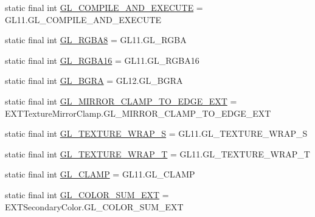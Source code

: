 \begin{DoxyCompactItemize}
static final int \mbox{\hyperlink{interfaceorg_1_1newdawn_1_1slick_1_1opengl_1_1renderer_1_1_s_g_l_a43e3cd16dc9ba9bc850f4c6f035c0ba7}{G\+L\+\_\+\+C\+O\+M\+P\+I\+L\+E\+\_\+\+A\+N\+D\+\_\+\+E\+X\+E\+C\+U\+TE}} = G\+L11.\+G\+L\+\_\+\+C\+O\+M\+P\+I\+L\+E\+\_\+\+A\+N\+D\+\_\+\+E\+X\+E\+C\+U\+TE
\item 
static final int \mbox{\hyperlink{interfaceorg_1_1newdawn_1_1slick_1_1opengl_1_1renderer_1_1_s_g_l_a015ce5deda3c63768e9784f5132cfc17}{G\+L\+\_\+\+R\+G\+B\+A8}} = G\+L11.\+G\+L\+\_\+\+R\+G\+BA
\item 
static final int \mbox{\hyperlink{interfaceorg_1_1newdawn_1_1slick_1_1opengl_1_1renderer_1_1_s_g_l_a66c36ff1594277277c28955a35428008}{G\+L\+\_\+\+R\+G\+B\+A16}} = G\+L11.\+G\+L\+\_\+\+R\+G\+B\+A16
\item 
static final int \mbox{\hyperlink{interfaceorg_1_1newdawn_1_1slick_1_1opengl_1_1renderer_1_1_s_g_l_ae752a498b0a87eeaa6ca19488c992906}{G\+L\+\_\+\+B\+G\+RA}} = G\+L12.\+G\+L\+\_\+\+B\+G\+RA
\item 
static final int \mbox{\hyperlink{interfaceorg_1_1newdawn_1_1slick_1_1opengl_1_1renderer_1_1_s_g_l_af110bc1dacabdf79561c080a32b5ac87}{G\+L\+\_\+\+M\+I\+R\+R\+O\+R\+\_\+\+C\+L\+A\+M\+P\+\_\+\+T\+O\+\_\+\+E\+D\+G\+E\+\_\+\+E\+XT}} = E\+X\+T\+Texture\+Mirror\+Clamp.\+G\+L\+\_\+\+M\+I\+R\+R\+O\+R\+\_\+\+C\+L\+A\+M\+P\+\_\+\+T\+O\+\_\+\+E\+D\+G\+E\+\_\+\+E\+XT
\item 
static final int \mbox{\hyperlink{interfaceorg_1_1newdawn_1_1slick_1_1opengl_1_1renderer_1_1_s_g_l_af4db69492d880427944ce3a00b55cfa4}{G\+L\+\_\+\+T\+E\+X\+T\+U\+R\+E\+\_\+\+W\+R\+A\+P\+\_\+S}} = G\+L11.\+G\+L\+\_\+\+T\+E\+X\+T\+U\+R\+E\+\_\+\+W\+R\+A\+P\+\_\+S
\item 
static final int \mbox{\hyperlink{interfaceorg_1_1newdawn_1_1slick_1_1opengl_1_1renderer_1_1_s_g_l_a11d55a93191598eaefc27ace10dea1af}{G\+L\+\_\+\+T\+E\+X\+T\+U\+R\+E\+\_\+\+W\+R\+A\+P\+\_\+T}} = G\+L11.\+G\+L\+\_\+\+T\+E\+X\+T\+U\+R\+E\+\_\+\+W\+R\+A\+P\+\_\+T
\item 
static final int \mbox{\hyperlink{interfaceorg_1_1newdawn_1_1slick_1_1opengl_1_1renderer_1_1_s_g_l_a0879c89067fa4cc3be659b643da6bfab}{G\+L\+\_\+\+C\+L\+A\+MP}} = G\+L11.\+G\+L\+\_\+\+C\+L\+A\+MP
\item 
static final int \mbox{\hyperlink{interfaceorg_1_1newdawn_1_1slick_1_1opengl_1_1renderer_1_1_s_g_l_a6fa6421242267109572a04c2f96f496e}{G\+L\+\_\+\+C\+O\+L\+O\+R\+\_\+\+S\+U\+M\+\_\+\+E\+XT}} = E\+X\+T\+Secondary\+Color.\+G\+L\+\_\+\+C\+O\+L\+O\+R\+\_\+\+S\+U\+M\+\_\+\+E\+XT
\item 

\end{DoxyCompactItemize}
